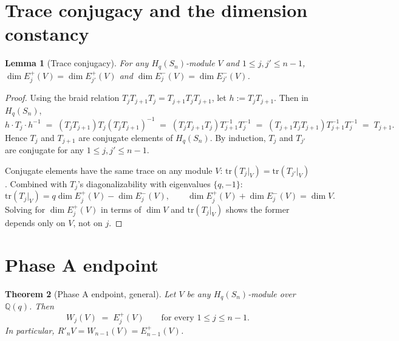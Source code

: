 \documentclass[11pt]{article}
\newtheorem{theorem}{Theorem}
\newtheorem{lemma}[theorem]{Lemma}
\theoremstyle{definition}
\begin{document}
\section{Trace conjugacy and the dimension constancy}\label{sec:trace}

\begin{lemma}[Trace conjugacy]\label{lem:trace}
For any $H_q(S_n)$-module $V$ and $1 \le j, j' \le n-1$,
$\dim E_j^+(V) = \dim E_{j'}^+(V)$ and
$\dim E_j^-(V) = \dim E_{j'}^-(V)$.
\end{lemma}

\begin{proof}
Using the braid relation $T_j T_{j+1} T_j = T_{j+1} T_j T_{j+1}$,
let $h := T_j T_{j+1}$.  Then in $H_q(S_n)$,
\[
   h \cdot T_j \cdot h^{-1}
   \;=\;
   (T_j T_{j+1}) T_j (T_j T_{j+1})^{-1}
   \;=\;
   (T_j T_{j+1} T_j) T_{j+1}^{-1} T_j^{-1}
   \;=\;
   (T_{j+1} T_j T_{j+1}) T_{j+1}^{-1} T_j^{-1}
   \;=\;
   T_{j+1}.
\]
Hence $T_j$ and $T_{j+1}$ are conjugate elements of $H_q(S_n)$.
By induction, $T_j$ and $T_{j'}$ are conjugate for any $1 \le j, j'
\le n-1$.

Conjugate elements have the same trace on any module $V$:
$\mathrm{tr}(T_j|_V) = \mathrm{tr}(T_{j'}|_V)$.  Combined with
$T_j$'s diagonalizability with eigenvalues $\{q, -1\}$:
\[
   \mathrm{tr}(T_j|_V) = q \dim E_j^+(V) - \dim E_j^-(V),
   \qquad
   \dim E_j^+(V) + \dim E_j^-(V) = \dim V.
\]
Solving for $\dim E_j^+(V)$ in terms of $\dim V$ and
$\mathrm{tr}(T_j|_V)$ shows the former depends only on $V$, not on
$j$.
\end{proof}

\section{Phase A endpoint}\label{sec:phaseA}

\begin{theorem}[Phase A endpoint, general]\label{thm:phase-a}
Let $V$ be any $H_q(S_n)$-module over $\mathbb{Q}(q)$.  Then
\begin{equation}\label{eq:phase-a}
   W_j(V) \;=\; E_j^+(V)
   \qquad
   \text{for every } 1 \le j \le n-1.
\end{equation}
In particular, $R'_n V = W_{n-1}(V) = E_{n-1}^+(V)$.
\end{theorem}
\end{document}
